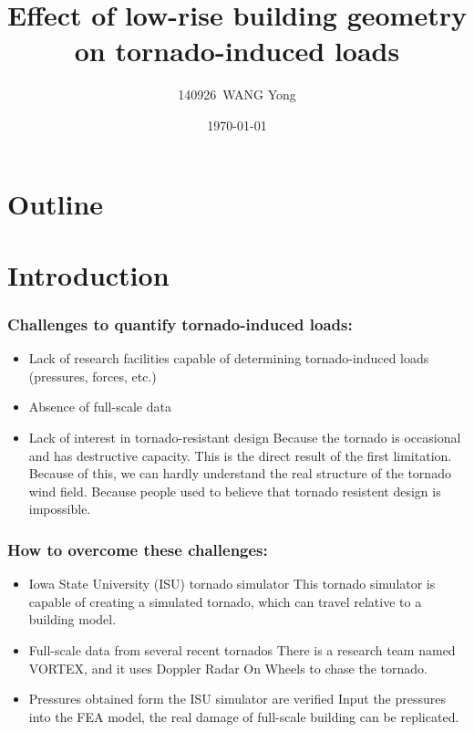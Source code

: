 \documentclass[handout]{beamer}
\title{Effect of low-rise building geometry on tornado-induced loads}
\author{140926~WANG Yong}
\institute{Southeast University}
\date{\today}
\begin{document}
\begin{frame}
	\titlepage
\end{frame}

\section*{Outline}
\begin{frame}
	\tableofcontents
\end{frame}

\section{Introduction}

\begin{frame}
    \frametitle{Challenges to quantify  tornado-induced loads:}
    \begin{itemize}
    	\item<1-> Lack of research facilities capable of determining tornado-induced loads (pressures, forces, etc.)
    	\item<2-> Absence of full-scale data
    	\item<3-> Lack of interest in tornado-resistant design
    		 {Because the tornado is occasional and has destructive capacity. }
    		 {This is the direct result of the first limitation. Because of this, we can hardly understand the real structure of the tornado wind field.}
    		 {Because people used to believe that tornado resistent design is impossible.}
    \end{itemize}
\end{frame}


\begin{frame}
    \frametitle{How to overcome these challenges:}
    \begin{itemize}
    	\item<1-> Iowa State University (ISU) tornado simulator
    		 {This tornado simulator is capable of creating a simulated tornado, which can travel relative to a building model.}
    	\item<2-> Full-scale data from several recent tornados
    		 {There is a research team named VORTEX, and it uses Doppler Radar On Wheels to chase the tornado.}
    	\item<3-> Pressures obtained form  the ISU simulator are verified
    	 	 {Input the pressures into the FEA model, the real damage of full-scale building can be replicated.}
    \end{itemize}
\end{frame}
\end{document}
